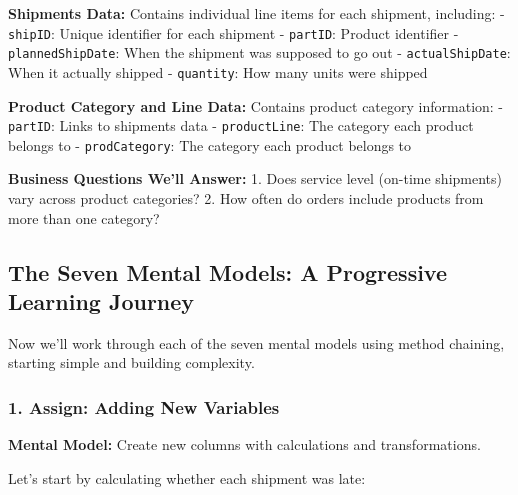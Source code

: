 \documentclass[
  letterpaper,
  DIV=11,
  numbers=noendperiod]{scrartcl}
\begin{document}
\begin{tcolorbox}[enhanced jigsaw, bottomtitle=1mm, opacitybacktitle=0.6, toptitle=1mm, colbacktitle=quarto-callout-note-color!10!white, breakable, coltitle=black, bottomrule=.15mm, left=2mm, colframe=quarto-callout-note-color-frame, colback=white, title=\textcolor{quarto-callout-note-color}{\faInfo}\hspace{0.5em}{💡 Understanding the Data}, leftrule=.75mm, arc=.35mm, rightrule=.15mm, opacityback=0, toprule=.15mm, titlerule=0mm]

\textbf{Shipments Data:} Contains individual line items for each
shipment, including: - \texttt{shipID}: Unique identifier for each
shipment - \texttt{partID}: Product identifier -
\texttt{plannedShipDate}: When the shipment was supposed to go out -
\texttt{actualShipDate}: When it actually shipped - \texttt{quantity}:
How many units were shipped

\textbf{Product Category and Line Data:} Contains product category
information: - \texttt{partID}: Links to shipments data -
\texttt{productLine}: The category each product belongs to -
\texttt{prodCategory}: The category each product belongs to

\textbf{Business Questions We'll Answer:} 1. Does service level (on-time
shipments) vary across product categories? 2. How often do orders
include products from more than one category?

\end{tcolorbox}

\subsection{The Seven Mental Models: A Progressive Learning
Journey}\label{the-seven-mental-models-a-progressive-learning-journey}

Now we'll work through each of the seven mental models using method
chaining, starting simple and building complexity.

\subsubsection{1. Assign: Adding New
Variables}\label{assign-adding-new-variables}

\textbf{Mental Model:} Create new columns with calculations and
transformations.

Let's start by calculating whether each shipment was late:
\end{document}
